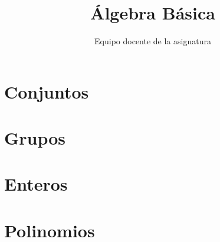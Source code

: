 \documentclass[12pt]{book}
\title{Álgebra Básica}
\author{Equipo docente de la asignatura}
\let\section\chapter
\theoremstyle{definition}
\theoremstyle{remark}
\numberwithin{equation}{section}
\begin{document}
\maketitle

\tableofcontents

\section{Conjuntos}



\section{Grupos}



\section{Enteros}



\section{Polinomios}


\end{document}
